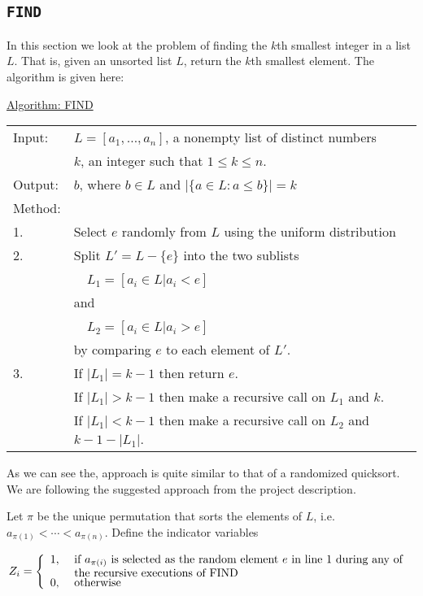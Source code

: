 \documentclass[article,a4paper,oneside]{article}
\newcommand{\+}[1]{\ensuremath{\boldsymbol{#1}}}
\begin{document}
\subsection*{\texttt{FIND}}
In this section we look at the problem of finding the $k$th smallest integer in a list $L$. That is, given an unsorted list $L$, return the $k$th smallest element.
The algorithm is given here:
\begin{center}\begin{minipage}{5in}
\underline{Algorithm: FIND}\\
\begin{tabular}{ll}
Input: & $L=[a_1,\ldots,a_n]$, a nonempty list of distinct numbers\\
& $k$, an integer such that $1\leq k\leq n$.\\ 
Output: & $b$, where $b\in L$ and $|\{a\in L:a\leq b\}|=k$\\
Method:\\
{\hfill}1. & Select $e$ randomly from $L$ using the uniform distribution\\
{\hfill}2. & Split $L'=L-\{e\}$ into the two sublists\\
& \ \ $L_1=[a_i\in L|a_i<e]$\\
& and\\
& \ \ $L_2=[a_i\in L|a_i>e]$\\
& by comparing $e$ to each element of $L'$.\\
{\hfill}3. & If $|L_1|=k-1$ then return $e$.\\
& If $|L_1|>k-1$ then make a recursive call on $L_1$ and $k$.\\
& \begin{minipage}{4in}
If $|L_1|<k-1$ then make a recursive call on $L_2$ and $k-1-|L_1|$.
\end{minipage}
\end{tabular}
\end{minipage}\end{center}
As we can see the, approach is quite similar to that of a randomized quicksort.
We are following the suggested approach from the project description.
\par

Let $\pi$ be the unique permutation that sorts the elements of $L$,
i.e. $a_{\pi(1)}<\cdots <a_{\pi(n)}$.  Define the indicator variables

$$Z_{i}=\left\{\begin{array}{ll}
1, & \mbox{
\begin{minipage}[t]{4in}
  if $a_{\pi(i)}$ is selected as the random element $e$ in line 1
  during any of the recursive executions of FIND
\end{minipage}
}
\\
0, & \mbox{ otherwise}
\end{array}\right.$$
\end{document}
